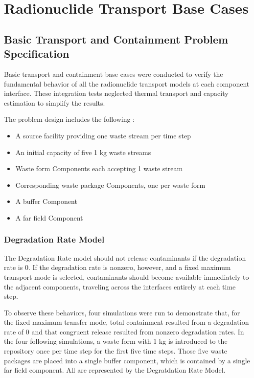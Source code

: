 \section{Radionuclide Transport Base Cases}\label{sec:nuclide_base_cases}
\subsection{Basic Transport and Containment Problem Specification}
Basic transport and containment base cases were conducted to verify the 
fundamental behavior of all the radionuclide transport models at each component 
interface. These integration tests neglected thermal transport and capacity 
estimation to simplify the results.  

The problem design includes the following : 
\begin{itemize}
\item{A source facility providing one waste stream per time step}
\item{An initial capacity of five 1 kg waste streams}
\item{Waste form Components each accepting 1 waste stream} 
\item{Corresponding waste package Components, one per waste form}
\item{A buffer Component}
\item{A far field Component}
\end{itemize}

\subsubsection{Degradation Rate Model}
The Degradation Rate model should not release contaminants if the degradation 
rate is 0. If the degradation rate is nonzero, however, and a fixed maximum 
transport mode is selected, contaminants should become available immediately to 
the adjacent components, traveling across the interfaces entirely at each 
time step. 

To observe these behaviors, four simulations were run to demonstrate that, for 
the fixed maximum transfer mode, total 
containment resulted from a degradation rate of 0 and that congruent release 
resulted from nonzero degradation rates. 
In the four following simulations, a waste form with 1 kg is introduced to the repository once 
per time step for the first five time steps. Those five waste packages are 
placed into a single buffer component, which is contained by a single far field 
component. All are represented by the Degratdation Rate Model. 

